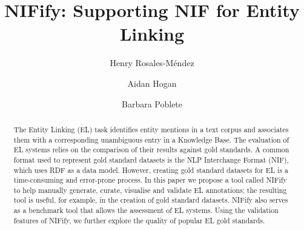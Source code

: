 \documentclass[sigconf]{acmart}
\begin{document}
%
\title{NIFify: Supporting NIF for Entity Linking}

%
\author{Henry Rosales-M\'endez}

\author{Aidan Hogan}


\author{Barbara Poblete}




%
\renewcommand{\shortauthors}{Rosales-M\'endez et al.}

%
\begin{abstract}
The Entity Linking (EL) task identifies entity mentions in a text corpus and associates them with a corresponding unambiguous entry in a Knowledge Base. The evaluation of EL systems relies on the comparison of their results against gold standards. A common format used to represent gold standard datasets is the NLP Interchange Format (NIF), which uses RDF as a data model. However, creating gold standard datasets for EL is a time-consuming and error-prone process. In this paper we propose a tool called NIFify to help manually generate, curate, visualise and validate EL annotations; the resulting tool is useful, for example, in the creation of gold standard datasets. NIFify also serves as a benchmark tool that allows the assessment of EL systems. Using the validation features of NIFify, we further explore the quality of popular EL gold standards. 
\end{abstract}
\end{document}
